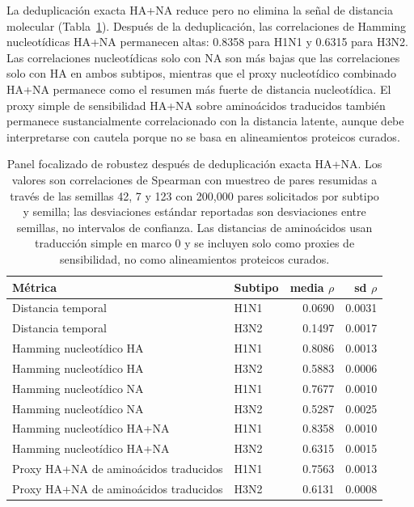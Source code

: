 \documentclass[11pt]{article}
\begin{document}
La deduplicación exacta HA+NA reduce pero no elimina la señal de distancia molecular (Tabla~\ref{tab:robust-spearman}). Después de la deduplicación, las correlaciones de Hamming nucleotídicas HA+NA permanecen altas: 0.8358 para H1N1 y 0.6315 para H3N2. Las correlaciones nucleotídicas solo con NA son más bajas que las correlaciones solo con HA en ambos subtipos, mientras que el proxy nucleotídico combinado HA+NA permanece como el resumen más fuerte de distancia nucleotídica. El proxy simple de sensibilidad HA+NA sobre aminoácidos traducidos también permanece sustancialmente correlacionado con la distancia latente, aunque debe interpretarse con cautela porque no se basa en alineamientos proteicos curados.

\begin{table}[H]
\centering
\caption{Panel focalizado de robustez después de deduplicación exacta HA+NA. Los valores son correlaciones de Spearman con muestreo de pares resumidas a través de las semillas 42, 7 y 123 con 200,000 pares solicitados por subtipo y semilla; las desviaciones estándar reportadas son desviaciones entre semillas, no intervalos de confianza. Las distancias de aminoácidos usan traducción simple en marco 0 y se incluyen solo como proxies de sensibilidad, no como alineamientos proteicos curados.}
\label{tab:robust-spearman}
\begin{tabular}{llrr}
\toprule
Métrica & Subtipo & media $\rho$ & sd $\rho$ \\
\midrule
Distancia temporal & H1N1 & 0.0690 & 0.0031 \\
Distancia temporal & H3N2 & 0.1497 & 0.0017 \\
Hamming nucleotídico HA & H1N1 & 0.8086 & 0.0013 \\
Hamming nucleotídico HA & H3N2 & 0.5883 & 0.0006 \\
Hamming nucleotídico NA & H1N1 & 0.7677 & 0.0010 \\
Hamming nucleotídico NA & H3N2 & 0.5287 & 0.0025 \\
Hamming nucleotídico HA+NA & H1N1 & 0.8358 & 0.0010 \\
Hamming nucleotídico HA+NA & H3N2 & 0.6315 & 0.0015 \\
Proxy HA+NA de aminoácidos traducidos & H1N1 & 0.7563 & 0.0013 \\
Proxy HA+NA de aminoácidos traducidos & H3N2 & 0.6131 & 0.0008 \\
\bottomrule
\end{tabular}
\end{table}
\end{document}
